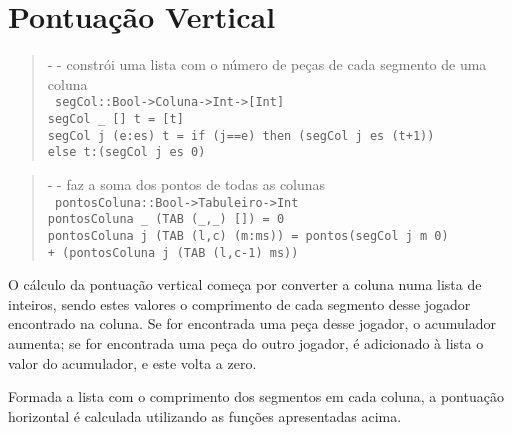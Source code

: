 \documentclass[a4paper,titlepage]{scrreprt}
\begin{document}
	\section{Pontuação Vertical}
		\begin{quote}
			{\small - - constrói uma lista com o número de peças de cada segmento de uma coluna\\}
			{\tt
			segCol::Bool->Coluna->Int->[Int]\\
			segCol \_ [] t = [t]\\
			segCol j (e:es) t = if (j==e) then (segCol j es (t+1))\\
			else t:(segCol j es 0)
			}
		\end{quote}
		\begin{quote}
			{\small - - faz a soma dos pontos de todas as colunas\\}
			{\tt
			pontosColuna::Bool->Tabuleiro->Int\\
			pontosColuna \_ (TAB (\_,\_) []) = 0\\
			pontosColuna j (TAB (l,c) (m:ms)) = pontos(segCol j m 0)\\
			+ (pontosColuna j (TAB (l,c-1) ms))
			}
		\end{quote}
	O cálculo da pontuação vertical começa por converter a coluna numa lista de inteiros, sendo estes valores o comprimento de cada
	segmento desse jogador encontrado na coluna. Se for encontrada uma peça desse jogador, o acumulador aumenta; se for encontrada
	uma peça do outro jogador, é adicionado à lista o valor do acumulador, e este volta a zero.
	
	Formada a lista com o comprimento dos segmentos em cada coluna, a pontuação horizontal é calculada utilizando as funções
	apresentadas acima.
\end{document}
